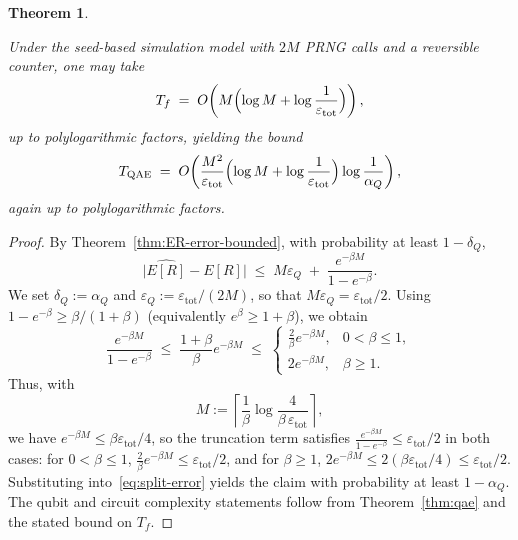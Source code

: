 \documentclass[11pt]{article}
\newtheorem{theorem}{Theorem}
\begin{document}
\begin{theorem}
\begin{enumerate}
Under the seed-based simulation model with $2M$ PRNG calls and a reversible
counter, one may take
\begin{equation}
\label{eq:tf-bound}
T_f
\;=\;
O\!\left(
M\Bigl(\log M + \log\frac{1}{\varepsilon_{\mathrm{tot}}}\Bigr)
\right),
\end{equation}
up to polylogarithmic factors, yielding the bound
\begin{equation}
\label{eq:gates-cert-explicit}
T_{\mathrm{QAE}}
\;=\;
O\!\left(
\frac{M^2}{\varepsilon_{\mathrm{tot}}}
\Bigl(\log M + \log\frac{1}{\varepsilon_{\mathrm{tot}}}\Bigr)
\log\frac{1}{\alpha_Q}
\right),
\end{equation}
again up to polylogarithmic factors.
\end{enumerate}
\end{theorem}


\begin{proof}
By Theorem~\ref{thm:ER-error-bounded}, with probability at least $1-\delta_Q$,
\begin{equation}
\label{eq:split-error}
\bigl|\widehat{E[R]}-E[R]\bigr|
\;\le\;
M\varepsilon_Q
\;+\;
\frac{e^{-\beta M}}{1-e^{-\beta}}.
\end{equation}
We set $\delta_Q:=\alpha_Q$ and $\varepsilon_Q:=\varepsilon_{\mathrm{tot}}/(2M)$,
so that $M\varepsilon_Q=\varepsilon_{\mathrm{tot}}/2$.
Using $1-e^{-\beta}\ge \beta/(1+\beta)$ (equivalently $e^{\beta}\ge 1+\beta$),
we obtain
\[
\frac{e^{-\beta M}}{1-e^{-\beta}}
\;\le\;
\frac{1+\beta}{\beta}e^{-\beta M}
\;\le\;
\begin{cases}
\frac{2}{\beta}e^{-\beta M}, & 0<\beta\le 1,\\[4pt]
2e^{-\beta M}, & \beta\ge 1.
\end{cases}
\]
Thus, with
\[
M := \left\lceil \frac{1}{\beta}\log\frac{4}{\beta\,\varepsilon_{\mathrm{tot}}}\right\rceil,
\]
we have $e^{-\beta M}\le \beta\varepsilon_{\mathrm{tot}}/4$, so the truncation term
satisfies $\frac{e^{-\beta M}}{1-e^{-\beta}}\le \varepsilon_{\mathrm{tot}}/2$
in both cases:
for $0<\beta\le 1$,
$\frac{2}{\beta}e^{-\beta M}\le \varepsilon_{\mathrm{tot}}/2$,
and for $\beta\ge 1$,
$2e^{-\beta M}\le 2(\beta\varepsilon_{\mathrm{tot}}/4)\le \varepsilon_{\mathrm{tot}}/2$.
Substituting into~\eqref{eq:split-error} yields the claim with probability
at least $1-\alpha_Q$.
The qubit and circuit complexity statements follow from
Theorem~\ref{thm:qae} and the stated bound on $T_f$.
\end{proof}
\end{document}
